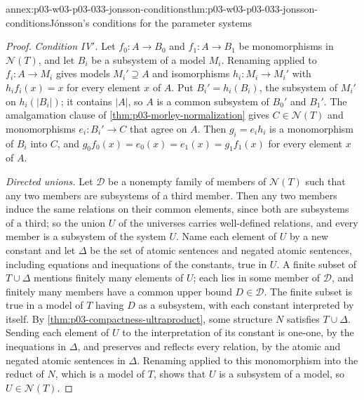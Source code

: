 \begin{annexitem}{annex:p03-w03-p03-033-jonsson-conditions}{thm:p03-w03-p03-033-jonsson-conditions}{Jónsson's conditions for the parameter systems}
\begin{proof}
\emph{Condition IV\('\).} Let \(f_0:A\to B_0\) and \(f_1:A\to B_1\) be
monomorphisms in \(\mathcal N(T)\), and let \(B_i\) be a subsystem of a
model \(M_i\). Renaming applied to \(f_i:A\to M_i\) gives models
\(M_i'\supseteq A\) and isomorphisms \(h_i:M_i\to M_i'\) with
\(h_if_i(x)=x\) for every element \(x\) of \(A\). Put
\(B_i'=h_i(B_i)\), the subsystem of \(M_i'\) on \(h_i(|B_i|)\); it
contains \(|A|\), so \(A\) is a common subsystem of \(B_0'\) and
\(B_1'\). The amalgamation clause of \cref{thm:p03-morley-normalization}
gives \(C\in\mathcal N(T)\) and monomorphisms \(e_i:B_i'\to C\) that agree
on \(A\). Then \(g_i=e_ih_i\) is a monomorphism of \(B_i\) into \(C\), and
\(g_0f_0(x)=e_0(x)=e_1(x)=g_1f_1(x)\) for every element \(x\) of \(A\).

\emph{Directed unions.} Let \(\mathcal D\) be a nonempty family of members
of \(\mathcal N(T)\) such that any two members are subsystems of a third
member. Then any two members induce the same relations on their common
elements, since both are subsystems of a third; so the union \(U\) of the
universes carries well-defined relations, and every member is a subsystem
of the system \(U\). Name each element of \(U\) by a new constant and let
\(\Delta\) be the set of atomic sentences and negated atomic sentences,
including equations and inequations of the constants, true in \(U\). A
finite subset of \(T\cup\Delta\) mentions finitely many elements of \(U\);
each lies in some member of \(\mathcal D\), and finitely many members have
a common upper bound \(D\in\mathcal D\). The finite subset is true in a
model of \(T\) having \(D\) as a subsystem, with each constant
interpreted by itself. By \cref{thm:p03-compactness-ultraproduct}, some
structure \(N\) satisfies \(T\cup\Delta\). Sending each element of \(U\)
to the interpretation of its constant is one-one, by the inequations in
\(\Delta\), and preserves and reflects every relation, by the atomic and
negated atomic sentences in \(\Delta\). Renaming applied to this
monomorphism into the reduct of \(N\), which is a model of \(T\), shows
that \(U\) is a subsystem of a model, so \(U\in\mathcal N(T)\).
\end{proof}
\end{annexitem}

